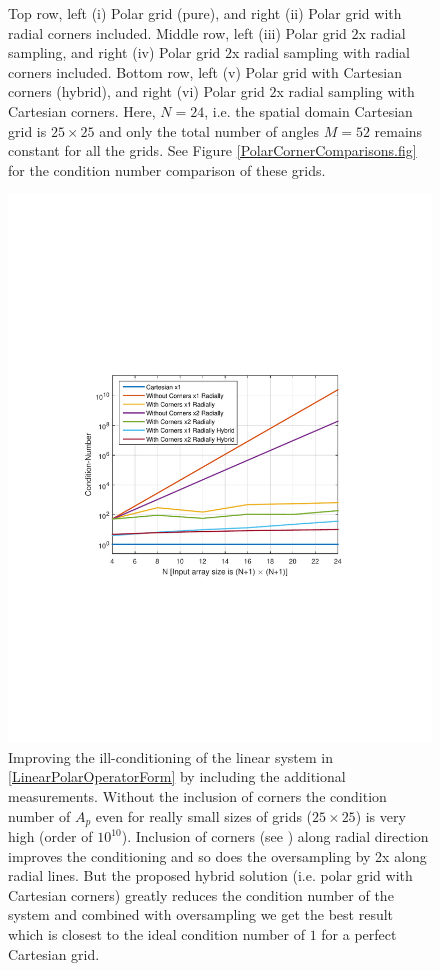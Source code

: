 \documentclass{UCF_ETD}
\begin{document}
\begin{figure}[H]
\begin{center}
 \caption{Top row, left (i) Polar grid (pure), and right (ii) Polar grid with radial corners included. Middle row, left (iii) Polar grid $2$x radial sampling, and right (iv) Polar grid $2$x radial sampling with radial corners included. Bottom row, left (v) Polar grid with Cartesian corners (hybrid), and right (vi) Polar grid $2$x radial sampling with Cartesian corners. Here, $N = 24$, i.e. the spatial domain Cartesian grid is $25\times 25$ and only the total number of angles $M = 52$ remains constant for all the grids. See Figure \ref{PolarCornerComparisons.fig} for the condition number comparison of these grids.}
 \label{DifferentTypesOfGrid.fig}
 \end{center}
 \end{figure}
 
 \begin{figure}[H]
 \begin{center}
 \includegraphics[scale=0.9]{PolarSphericalDFT/CornerComparisons}
 \caption{Improving the ill-conditioning of the linear system in \eqref{LinearPolarOperatorForm} by including the additional measurements. Without the inclusion of corners the condition number of $A_p$ even for really small sizes of grids ($25\times 25$) is very high (order of $10^{10}$). Inclusion of corners (see \cite{Markus2007}) along radial direction improves the conditioning and so does the oversampling by 2x along radial lines. But the proposed hybrid solution (i.e. polar grid with Cartesian corners) greatly reduces the condition number of the system and combined with oversampling we get the best result which is closest to the ideal condition number of $1$ for a perfect Cartesian grid. }

\end{center}
\end{figure}
\end{document}

